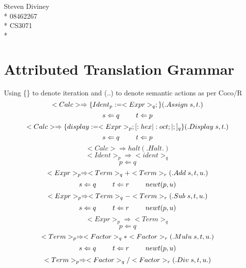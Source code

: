 \documentclass[a4paper,12pt]{article}
\begin{document}
\begin{center}
Steven Diviney \\*
08462267 \\*
CS3071 \\*

\end{center}
\clearpage

\section{Attributed Translation Grammar}
Using \{\} to denote iteration and (..) to denote semantic actions as per Coco/R
\vspace{2 mm}
\[ <Calc> \Rightarrow \{Ident_{p} := <Expr>_{q};\} (. Assign\hspace{1 mm} s,t .) \]
\[s \Leftarrow q \hspace{2 pc}  t \Leftarrow p \]
\vspace{2 mm}
\[ <Calc> \Rightarrow \{display := <Expr>_{p};[:hex | :oct; | ;]_{q}\} (. Display\hspace{1 mm} s,t .) \]
\[s \Leftarrow q \hspace{2 pc}  t \Leftarrow p \]
\vspace{2 mm}
\[ <Calc> \Rightarrow halt (. Halt .) \]
\vspace{2 mm}
\[ <Ident>_{p} \Rightarrow <ident>_{q} \]
\[p \Leftarrow q \]
\vspace{2 mm}
\[ <Expr>_{p} \Rightarrow <Term>_{q} + <Term>_{r} (.Add\hspace{1 mm} s,t,u .) \]
\[s \Leftarrow q \hspace{2 pc}  t \Leftarrow r \hspace{2 pc} newt(p,u) \]
\vspace{2 mm}
\[ <Expr>_{p} \Rightarrow <Term>_{q} - <Term>_{r} (.Sub\hspace{1 mm} s,t,u .) \]
\[s \Leftarrow q \hspace{2 pc}  t \Leftarrow r \hspace{2 pc} newt(p,u) \]
\vspace{2 mm}
\[ <Expr>_{p} \Rightarrow <Term>_{q} \]
\[p \Leftarrow q  \]
\vspace{2 mm}
\[ <Term>_{p} \Rightarrow <Factor>_{q} * <Factor>_{r} (.Mulu\hspace{1 mm} s,t,u .) \]
\[s \Leftarrow q \hspace{2 pc}  t \Leftarrow r \hspace{2 pc} newt(p,u) \]
\vspace{2 mm}
\[ <Term>_{p} \Rightarrow <Factor>_{q} / <Factor>_{r} (.Div\hspace{1 mm} s,t,u .) \]
\end{document}
